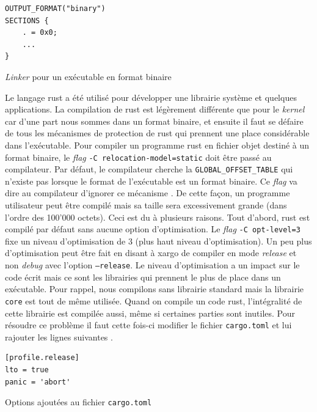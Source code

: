 \begin{code}
\begin{verbatim}
OUTPUT_FORMAT("binary")
SECTIONS {
    . = 0x0;
    ...
}
\end{verbatim}
\caption{\textit{Linker} pour un exécutable en format binaire}
\label{lst:tasks:app:linker}
\end{code} \bigbreak

Le langage rust a été utilisé pour développer une librairie système et quelques
applications. La compilation de rust est légèrement différente que pour le
\textit{kernel} car d'une part nous sommes dans un format binaire, et ensuite
il faut se défaire de tous les mécanismes de protection de rust qui prennent
une place considérable dans l'exécutable. Pour compiler un programme rust
en fichier objet destiné à un format binaire, le \textit{flag}
\texttt{-C relocation-model=static} doit être passé au compilateur.
Par défaut, le compilateur cherche la \texttt{GLOBAL_OFFSET_TABLE}
qui n'existe pas lorsque le format de l'exécutable est un format binaire.
Ce \textit{flag} va dire au compilateur d'ignorer ce mécanisme \cite{ref25}.
De cette façon, un programme utilisateur peut être compilé mais sa taille sera
excessivement grande (dans l'ordre des 100'000 octets). Ceci est du à plusieurs
raisons. Tout d'abord, rust est compilé par défaut sans aucune option d'optimisation.
Le \textit{flag} \texttt{-C opt-level=3} fixe un niveau d'optimisation
de 3 (plus haut niveau d'optimisation). Un peu plus d'optimisation peut être
fait en disant à xargo de compiler en mode \textit{release} et non \textit{debug}
avec l'option \texttt{--release}. Le niveau d'optimisation a un impact
sur le code écrit mais ce sont les librairies qui prennent le plus de place dans
un exécutable. Pour rappel, nous compilons sans librairie standard mais la librairie
\texttt{core} est tout de même utilisée. Quand on compile un code rust,
l'intégralité de cette librairie est compilée aussi, même si certaines parties
sont inutiles. Pour résoudre ce problème il faut cette fois-ci modifier le fichier
\texttt{cargo.toml} et lui rajouter les lignes suivantes \cite{ref26}.

\begin{code}
\begin{verbatim}
[profile.release]
lto = true
panic = 'abort'
\end{verbatim}
\caption{Options ajoutées au fichier \texttt{cargo.toml}}
\label{lst:tasks:app:cargotoml}
\end{code} \bigbreak

